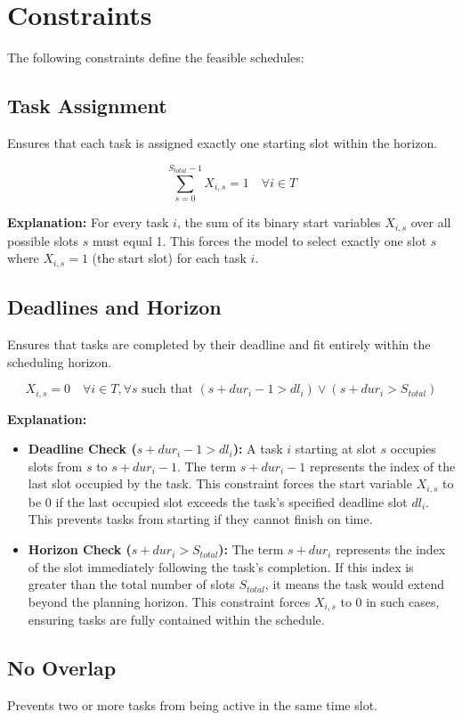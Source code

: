 \documentclass{article}
\begin{document}
\section{Constraints}

The following constraints define the feasible schedules:

\subsection{Task Assignment}
Ensures that each task is assigned exactly one starting slot within the horizon.

\[
\sum_{s=0}^{S_{total}-1} X_{i,s} = 1 \quad \forall i \in T
\]

\textbf{Explanation:} For every task $i$, the sum of its binary start variables $X_{i,s}$ over all possible slots $s$ must equal 1. This forces the model to select exactly one slot $s$ where $X_{i,s}=1$ (the start slot) for each task $i$.

\subsection{Deadlines and Horizon}
Ensures that tasks are completed by their deadline and fit entirely within the scheduling horizon.

\[
X_{i,s} = 0 \quad \forall i \in T, \forall s \text{ such that } (s + dur_i - 1 > dl_i) \lor (s + dur_i > S_{total})
\]

\textbf{Explanation:}
\begin{itemize}
    \item \textbf{Deadline Check ($s + dur_i - 1 > dl_i$):} A task $i$ starting at slot $s$ occupies slots from $s$ to $s + dur_i - 1$. The term $s + dur_i - 1$ represents the index of the last slot occupied by the task. This constraint forces the start variable $X_{i,s}$ to be 0 if the last occupied slot exceeds the task's specified deadline slot $dl_i$. This prevents tasks from starting if they cannot finish on time.
    \item \textbf{Horizon Check ($s + dur_i > S_{total}$):} The term $s + dur_i$ represents the index of the slot immediately following the task's completion. If this index is greater than the total number of slots $S_{total}$, it means the task would extend beyond the planning horizon. This constraint forces $X_{i,s}$ to 0 in such cases, ensuring tasks are fully contained within the schedule.
\end{itemize}

\subsection{No Overlap}
Prevents two or more tasks from being active in the same time slot.
\end{document}
